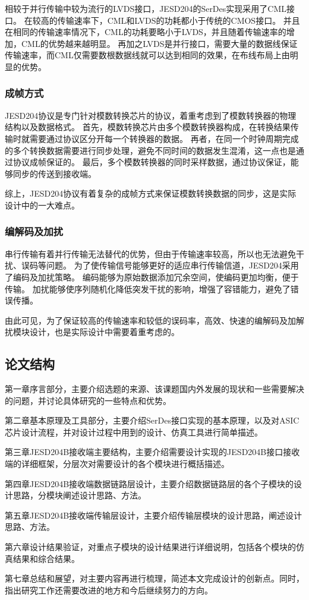 \documentclass[UTF8]{ctexart}
\begin{document}
相较于并行传输中较为流行的LVDS接口，JESD204的SerDes实现采用了CML接口。
在较高的传输速率下，CML和LVDS的功耗都小于传统的CMOS接口。
并且在相同的传输速率情况下，CML的功耗要略小于LVDS，并且随着传输速率的增加，CML的优势越来越明显。
再加之LVDS是并行接口，需要大量的数据线保证传输速率，而CML仅需要数根数据线就可以达到相同的效果，在布线布局上由明显的优势。

\subsubsection{成帧方式}

JESD204协议是专门针对模数转换芯片的协议，着重考虑到了模数转换器的物理结构以及数据格式。
首先，模数转换芯片由多个模数转换器构成，在转换结果传输时就需要通过协议区分开每一个转换器的数据。
再者，在同一个时钟周期完成的多个转换数据需要进行同步处理，避免不同时间的数据发生混淆，这一点也是通过协议成帧保证的。
最后，多个模数转换器的同时采样数据，通过协议保证，能够同步的传送到接收端。

综上，JESD204协议有着复杂的成帧方式来保证模数转换数据的同步，这是实际设计中的一大难点。

\subsubsection{编解码及加扰}

串行传输有着并行传输无法替代的优势，但由于传输速率较高，所以也无法避免干扰、误码等问题。
为了使传输信号能够更好的适应串行传输信道，JESD204采用了编码及加扰策略。
编码能够为原始数据添加冗余空间，使编码更加均衡，便于传输。
加扰能够使序列随机化降低突发干扰的影响，增强了容错能力，避免了错误传播。

由此可见，为了保证较高的传输速率和较低的误码率，高效、快速的编解码及加解扰模块设计，也是实际设计中需要着重考虑的。

\subsection{论文结构}

第一章序言部分，主要介绍选题的来源、该课题国内外发展的现状和一些需要解决的问题，并讨论具体研究的一些特点和优势。

第二章基本原理及工具部分，主要介绍SerDes接口实现的基本原理，以及对ASIC芯片设计流程，并对设计过程中用到的设计、仿真工具进行简单描述。

第三章JESD204B接收端主要结构，主要介绍需要设计实现的JESD204B接口接收端的详细框架，分层次对需要设计的各个模块进行概括描述。

第四章JESD204B接收端数据链路层设计，主要介绍数据链路层的各个子模块的设计思路，分模块阐述设计思路、方法。

第五章JESD204B接收端传输层设计，主要介绍传输层模块的设计思路，阐述设计思路、方法。

第六章设计结果验证，对重点子模块的设计结果进行详细说明，包括各个模块的仿真结果和综合结果。

第七章总结和展望，对主要内容再进行梳理，简述本文完成设计的创新点。同时，指出研究工作还需要改进的地方和今后继续努力的方向。


\end{document}
